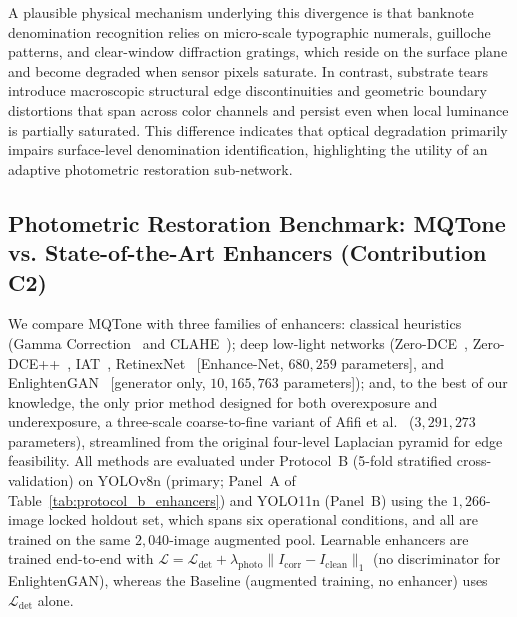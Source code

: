 \documentclass[final,5p,times,twocolumn,authoryear]{elsarticle}
\begin{document}
A plausible physical mechanism underlying this divergence is that banknote denomination recognition relies on micro-scale typographic numerals, guilloche patterns, and clear-window diffraction gratings, which reside on the surface plane and become degraded when sensor pixels saturate. In contrast, substrate tears introduce macroscopic structural edge discontinuities and geometric boundary distortions that span across color channels and persist even when local luminance is partially saturated. This difference indicates that optical degradation primarily impairs surface-level denomination identification, highlighting the utility of an adaptive photometric restoration sub-network.

\subsection{Photometric Restoration Benchmark: MQTone vs. State-of-the-Art Enhancers (Contribution C2)}
\label{subsec:exp_c2_mqtone}

We compare MQTone with three families of enhancers: classical heuristics (Gamma Correction~\cite{Poynton1993} and CLAHE~\cite{Zuiderveld1994}); deep low-light networks (Zero-DCE~\cite{Guo2020}, Zero-DCE++~\cite{Li2021}, IAT~\cite{Cui2022}, RetinexNet~\cite{Wei2018} [Enhance-Net, $680{,}259$ parameters], and EnlightenGAN~\cite{Jiang2021} [generator only, $10{,}165{,}763$ parameters]); and, to the best of our knowledge, the only prior method designed for both overexposure and underexposure, a three-scale coarse-to-fine variant of Afifi et al.~\cite{Afifi2021} ($3{,}291{,}273$ parameters), streamlined from the original four-level Laplacian pyramid for edge feasibility. All methods are evaluated under Protocol~B (5-fold stratified cross-validation) on YOLOv8n (primary; Panel~A of Table~\ref{tab:protocol_b_enhancers}) and YOLO11n (Panel~B) using the $1{,}266$-image locked holdout set, which spans six operational conditions, and all are trained on the same $2{,}040$-image augmented pool. Learnable enhancers are trained end-to-end with $\mathcal{L} = \mathcal{L}_{\text{det}} + \lambda_{\text{photo}} \|I_{\text{corr}} - I_{\text{clean}}\|_1$ (no discriminator for EnlightenGAN), whereas the Baseline (augmented training, no enhancer) uses $\mathcal{L}_{\text{det}}$ alone.
\end{document}
